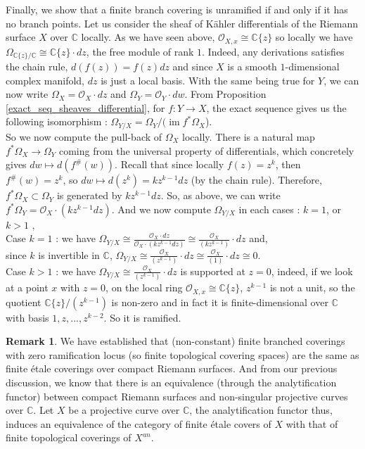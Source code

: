 \documentclass{article}
\theoremstyle{plain}
\theoremstyle{definition}
\newtheorem{remark}{Remark}
\DeclareMathOperator{\im}{im}
\begin{document}
\noindent Finally, we show that a finite branch covering is unramified if and only if it has no branch points.
Let us consider the sheaf of K\"ahler differentials of the Riemann surface $X$ over $\mathbb{C}$ locally. 
As we have seen above, $\mathcal{O}_{X,x} \cong \mathbb{C}\{z\}$ so locally we have $\Omega_{\mathbb{C}\{z\} /\mathbb{C}}\cong \mathbb{C}\{z\}\cdot dz$, the free module of rank $1$. 
Indeed, any derivations satisfies the chain rule, $d(f(z)) = f(z)dz$ and since $X$ is a smooth $1$-dimensional complex manifold, $dz$ is just a local basis.
With the same being true for $Y$,
we can now write $\Omega_X = \mathcal{O}_X\cdot dz$ and $\Omega_Y = \mathcal{O}_Y\cdot dw$.
From Proposition \ref{exact_seq_sheaves_differential}, for $f:Y\rightarrow X$, the exact sequence gives us the following isomorphism : $\Omega_{Y/X} = \Omega_Y / (\im f^*\Omega_X$).\\
So we now compute the pull-back of $\Omega_X$ locally. 
There is a natural map $f^*\Omega_X\rightarrow \Omega_Y$ coming from the universal property of differentials, which concretely gives $dw \mapsto d(f^\#(w))$. Recall that since locally $f(z) = z^k$, then $f^\#(w) = z^k$, so $dw\mapsto d(z^k) = kz^{k-1}dz$ (by the chain rule). Therefore, $f^*\Omega_X \subset \Omega_Y$ is generated by $kz^{k-1}dz$.
So, as above, we can write $f^*\Omega_Y = \mathcal{O}_X\cdot (kz^{k-1}dz)$. 
And we now compute $\Omega_{Y/X}$ in each cases : $k=1$, or $k>1$ ,\\
Case $k=1$ : we have $\Omega_{Y/X} \cong \frac{\mathcal{O}_X\cdot dz}{\mathcal{O}_X\cdot (kz^{k-1}dz)}\cong \frac{\mathcal{O}_X}{(kz^{k-1})}\cdot dz$ and,\\
since $k$ is invertible in $\mathbb{C}$, $\Omega_{Y/X} \cong \frac{\mathcal{O}_X}{(z^{k-1})} \cdot dz \cong \frac{\mathcal{O}_X}{(1)}\cdot dz \cong 0$.\\
Case $k>1$ : we have $\Omega_{Y/X} \cong \frac{\mathcal{O}_X}{(z^{k-1})}\cdot dz$ is supported at $z=0$, indeed, if we look at a point $x$ with $z=0$, on the local ring $\mathcal{O}_{X,x}\cong \mathbb{C}\{z\}$, $z^{k-1}$ is not a unit, so the quotient $\mathbb{C}\{z\}/(z^{k-1})$ is non-zero and in fact it is finite-dimensional over $\mathbb{C}$ with basis $1,z,...,z^{k-2}$. So it is ramified.

\begin{remark}
We have established that (non-constant) finite branched coverings with zero ramification locus (so finite topological covering spaces) are the same as finite \'etale coverings over compact Riemann surfaces. 
And from our previous discussion, we know that there is an equivalence (through the analytification functor) between compact Riemann surfaces and non-singular projective curves over $\mathbb{C}$.
Let $X$ be a projective curve over $\mathbb{C}$, the analytification functor thus, induces an equivalence of the category of finite \'etale covers of $X$ with that of finite topological coverings of $X^{an}$.
\end{remark}
\end{document}
